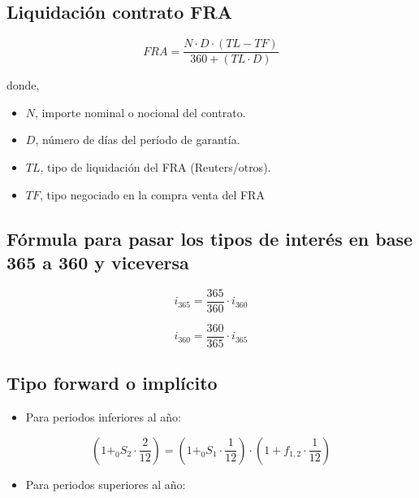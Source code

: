 \documentclass[
  letterpaper,
  DIV=11,
  numbers=noendperiod]{scrreprt}
\providecommand{\tightlist}{%
  \setlength{\itemsep}{0pt}\setlength{\parskip}{0pt}}\usepackage{longtable,booktabs,array}
\begin{document}
\begin{tcolorbox}
\subsection*{Liquidación contrato
FRA}\label{liquidaciuxf3n-contrato-fra}

\[FRA=\frac{N\cdot D\cdot\left(TL-TF\right)}{360+\left(TL\cdot D\right)}\]

donde,

\begin{itemize}
\item
  \(N\), importe nominal o nocional del contrato.
\item
  \(D\), número de días del período de garantía.
\item
  \(TL\), tipo de liquidación del FRA (Reuters/otros).
\item
  \(TF\), tipo negociado en la compra venta del FRA
\end{itemize}

\subsection*{Fórmula para pasar los tipos de interés en base 365 a 360 y
viceversa}\label{fuxf3rmula-para-pasar-los-tipos-de-interuxe9s-en-base-365-a-360-y-viceversa}

\[i_{365}=\frac{365 }{360 }\cdot i_{360}\]

\[i_{360}=\frac{360 }{365 }\cdot i_{365}\]

\subsection*{Tipo forward o
implícito}\label{tipo-forward-o-impluxedcito}

\begin{itemize}
\tightlist
\item
  Para periodos inferiores al año:
\end{itemize}

\[(1+_{0}S_{2} \cdot \frac{2 }{12 })=(1+_{0}S_{1} \cdot \frac{1 }{12 })\cdot(1+f_{1,2}\cdot \frac{1 }{12 })\]

\begin{itemize}
\tightlist
\item
  Para periodos superiores al año:
\end{itemize}


\end{tcolorbox}
\end{document}
